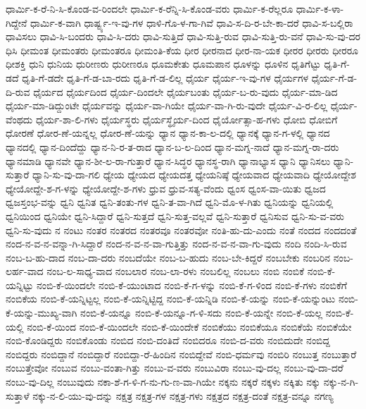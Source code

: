 {ಧಾರ್ಮಿ-ಕ-ರೆ-ನಿ-ಸಿ-ಕೊಂಡ-ವ-ರಿಂದಲೇ
ಧಾರ್ಮಿ-ಕ-ರೆನ್ನಿ-ಸಿ-ಕೊಂಡ-ವರು
ಧಾರ್ಮಿ-ಕ-ರೆಲ್ಲರೂ
ಧಾರ್ಮಿ-ಕ-ಳಾ-ಗಿದ್ದೇನೆ
ಧಾರ್ಮಿ-ಕ-ವಾಗಿ
ಧಾರ್ಷ್ಟ್ಯ-ಇ-ವು-ಗಳ
ಧಾಳಿ-ಗೊ-ಳ-ಗಾ-ಗಿವೆ
ಧಾವಿ-ಸ-ದಿ-ರ-ಬೇ-ಕಾ-ದರೆ
ಧಾವಿ-ಸ-ಬಲ್ಲಿರಾ
ಧಾವಿಸಲು
ಧಾವಿ-ಸಿ-ಬಂದರು
ಧಾವಿ-ಸಿ-ದರು
ಧಾವಿ-ಸುತ್ತಿದೆ
ಧಾವಿ-ಸುತ್ತಿ-ರುವ
ಧಾವಿ-ಸುತ್ತಿ-ರು-ವನೆ
ಧಾವಿ-ಸು-ವು-ದರ
ಧಿಸಿ
ಧೀಮಂತ
ಧೀಮಂತರು
ಧೀಮಂತರೂ
ಧೀಮಂತಿ-ಕೆಯ
ಧೀರ
ಧೀರನಾದ
ಧೀರ-ನಾ-ಯಕ
ಧೀರರ
ಧೀರರು
ಧೀರರೂ
ಧೀಶಕ್ತಿ
ಧುನಿ
ಧುನಿಯ
ಧುರೀಣರು
ಧುರೀಣರೂ
ಧೂಮಕೇತು
ಧೂಮಪಾನ
ಧೂಳನ್ನು
ಧೂಳಿನ
ಧೃತಿಗೆಟ್ಟು
ಧೃತಿ-ಗೆ-ಡದೆ
ಧೃತಿ-ಗೆ-ಡದೇ
ಧೃತಿ-ಗೆ-ಡ-ಬಾ-ರದು
ಧೃತಿ-ಗೆ-ಡ-ಲಿಲ್ಲ
ಧೈರ್ಯ
ಧೈರ್ಯ-ಇ-ವು-ಗಳ
ಧೈರ್ಯಗಳ
ಧೈರ್ಯ-ಗೆ-ಡ-ದಿ-ರುವ
ಧೈರ್ಯದ
ಧೈರ್ಯದಿಂದ
ಧೈರ್ಯ-ದಿಂದಲೇ
ಧೈರ್ಯಬಂತು
ಧೈರ್ಯ-ಬ-ರು-ವುದು
ಧೈರ್ಯ-ಮಾ-ಡಿದ
ಧೈರ್ಯ-ಮಾ-ಡಿದ್ದುಂಟೇ
ಧೈರ್ಯವನ್ನು
ಧೈರ್ಯ-ವಾ-ಗಿಯೇ
ಧೈರ್ಯ-ವಾ-ಗಿ-ರು-ವುದೇ
ಧೈರ್ಯ-ವಿ-ರ-ಲಿಲ್ಲ
ಧೈರ್ಯ-ವೆಂಥದು
ಧೈರ್ಯ-ಶಾ-ಲಿ-ಗಳು
ಧೈರ್ಯಸ್ಥರು
ಧೈರ್ಯಸ್ಥೈರ್ಯ-ದಿಂದ
ಧೈರ್ಯೋತ್ಸಾ-ಹ-ಗಳು
ಧೋಬಿ
ಧೋಬಿಗೆ
ಧೋರಣೆ
ಧೋರ-ಣೆ-ಯನ್ನಲ್ಲ
ಧೋರ-ಣೆ-ಯನ್ನು
ಧ್ಯಾನ
ಧ್ಯಾನ-ಕಾ-ಲ-ದಲ್ಲಿ
ಧ್ಯಾನಕ್ಕೆ
ಧ್ಯಾನ-ಗ-ಳಲ್ಲಿ
ಧ್ಯಾನದ
ಧ್ಯಾನದಲ್ಲಿ
ಧ್ಯಾನ-ದಿಂದೆದ್ದು
ಧ್ಯಾನ-ನಿ-ರ-ತ-ರಾದ
ಧ್ಯಾನ-ಬ-ಲ-ದಿಂದ
ಧ್ಯಾನ-ಮಗ್ನ-ನಾದೆ
ಧ್ಯಾನ-ಮಗ್ನ-ರಾ-ದರು
ಧ್ಯಾನಮಾಡಿ
ಧ್ಯಾನವೇ
ಧ್ಯಾನ-ಶೀ-ಲ-ರಾ-ಗುತ್ತಾರೆ
ಧ್ಯಾನ-ಸಿದ್ಧರ
ಧ್ಯಾನಸ್ಥ-ರಾಗಿ
ಧ್ಯಾನಾಭ್ಯಾಸ
ಧ್ಯಾನಿ
ಧ್ಯಾನಿಸಲು
ಧ್ಯಾನಿ-ಸುತ್ತಾರೆ
ಧ್ಯಾನಿ-ಸು-ವು-ದಾ-ಗಲಿ
ಧ್ಯೇಯ
ಧ್ಯೇಯದ
ಧ್ಯೇಯದತ್ತ
ಧ್ಯೇಯನಿಷ್ಠೆ
ಧ್ಯೇಯವಾದ
ಧ್ಯೇಯವಾದಿ
ಧ್ಯೇಯೋದ್ದೇಶ
ಧ್ಯೇಯೋದ್ದೇ-ಶ-ಗ-ಳನ್ನು
ಧ್ಯೇಯೋದ್ದೇ-ಶ-ಗಳು
ಧ್ರುವ
ಧ್ರುವ-ಸತ್ಯ-ವೆಂದು
ಧ್ವಂಸ
ಧ್ವಂಸ-ವಾ-ಯಿತು
ಧ್ವಜದ
ಧ್ವಜಸ್ತಂಭ-ವನ್ನು
ಧ್ವನಿ
ಧ್ವನಿತ
ಧ್ವನಿ-ತಂತು-ಗಳ
ಧ್ವನಿ-ತ-ವಾ-ಗಿದೆ
ಧ್ವನಿ-ಮೊ-ಳ-ಗಿತು
ಧ್ವನಿಯನ್ನು
ಧ್ವನಿಯಲ್ಲಿ
ಧ್ವನಿಯಿಂದ
ಧ್ವನಿಯೇ
ಧ್ವನಿ-ಸಿದ್ದಾರೆ
ಧ್ವನಿ-ಸುತ್ತದೆ
ಧ್ವನಿ-ಸುತ್ತ-ವಲ್ಲವೆ
ಧ್ವನಿ-ಸುತ್ತಾರೆ
ಧ್ವನಿಸುವ
ಧ್ವನಿ-ಸು-ವ-ವರು
ಧ್ವನಿ-ಸು-ವುದು
ನ
ನಂಟು
ನಂತರ
ನಂತರದ
ನಂತರವೂ
ನಂತರವೋ
ನಂತಿ-ಹು-ದು-ಎಂದು
ನಂತೆ
ನಂದದ
ನಂದದಂತೆ
ನಂದ-ನ-ವ-ನ-ವನ್ನಾ-ಗಿ-ಸಿದ್ದಾರೆ
ನಂದ-ನ-ವ-ನ-ವಾ-ಗುತ್ತಿತ್ತು
ನಂದ-ನ-ವ-ನ-ವಾ-ಗು-ವುದು
ನಂದಿ
ನಂದಿ-ಸಿ-ರುವ
ನಂಬ-ಬ-ಹು-ದಾದ
ನಂಬ-ದಾ-ದರು
ನಂಬದೆಯೇ
ನಂಬ-ಬ-ಹುದು
ನಂಬ-ಬೇ-ಕಿದ್ದರೆ
ನಂಬಬೇಕು
ನಂಬರಿನ
ನಂಬ-ಲರ್ಹ-ವಾದ
ನಂಬ-ಲ-ಸಾಧ್ಯ-ವಾದ
ನಂಬಲಾರ
ನಂಬ-ಲಾ-ರಳು
ನಂಬಲಿಲ್ಲ
ನಂಬಲು
ನಂಬಿ
ನಂಬಿಕೆ
ನಂಬಿ-ಕೆ-ಯನ್ನಿಟ್ಟು
ನಂಬಿ-ಕೆ-ಯಿಂದಲೇ
ನಂಬಿ-ಕೆ-ಯುಂಟಾದ
ನಂಬಿ-ಕೆ-ಗ-ಳನ್ನು
ನಂಬಿ-ಕೆ-ಗ-ಳಿಂದ
ನಂಬಿ-ಕೆ-ಗಳು
ನಂಬಿಕೆಗೆ
ನಂಬಿಕೆಯ
ನಂಬಿ-ಕೆ-ಯನ್ನಿಟ್ಟಲ್ಲ
ನಂಬಿ-ಕೆ-ಯನ್ನಿಟ್ಟಿದ್ದ
ನಂಬಿ-ಕೆ-ಯನ್ನಿಡಿ
ನಂಬಿ-ಕೆ-ಯನ್ನು
ನಂಬಿ-ಕೆ-ಯನ್ನುಂಟು
ನಂಬಿ-ಕೆ-ಯನ್ನು-ಮುಖ್ಯ-ವಾಗಿ
ನಂಬಿ-ಕೆ-ಯನ್ನೂ
ನಂಬಿ-ಕೆ-ಯನ್ನೂ-ಗ-ಳಿ-ಸದು
ನಂಬಿ-ಕೆ-ಯನ್ನೇ
ನಂಬಿ-ಕೆ-ಯಲ್ಲ
ನಂಬಿ-ಕೆ-ಯಲ್ಲಿ
ನಂಬಿ-ಕೆ-ಯಿಂದ
ನಂಬಿ-ಕೆ-ಯಿಂದಲೇ
ನಂಬಿ-ಕೆ-ಯಿಂದೇಕೆ
ನಂಬಿಕೆಯು
ನಂಬಿಕೆಯೂ
ನಂಬಿಕೆಯೆ
ನಂಬಿಕೆಯೇ
ನಂಬಿ-ಕೊಂಡಿದ್ದರು
ನಂಬಿಕೊಂಡು
ನಂಬಿದ
ನಂಬಿ-ದಂತಿದೆ
ನಂಬಿದರೂ
ನಂಬಿ-ದ-ವರು
ನಂಬಿದುದೇ
ನಂಬಿದ್ದ
ನಂಬಿದ್ದರು
ನಂಬಿದ್ದಾನೆ
ನಂಬಿದ್ದಾರೆ
ನಂಬಿದ್ದಾ-ರೆ-ಹಿಂದಿನ
ನಂಬಿದ್ದೇವೆ
ನಂಬಿ-ಧರ್ಮವು
ನಂಬಿರಿ
ನಂಬುತ್ತ
ನಂಬುತ್ತಾರೆ
ನಂಬುತ್ತೇವೋ
ನಂಬುವ
ನಂಬು-ವಂತಾ-ಗಿತ್ತು
ನಂಬು-ವ-ವರು
ನಂಬುವಿರಾ
ನಂಬು-ವು-ದಲ್ಲ
ನಂಬು-ವು-ದಾ-ದರೆ
ನಂಬು-ವು-ದಿಲ್ಲ
ನಂಬುವುದು
ನಕಾ-ಶೆ-ಗ-ಳಿ-ಗ-ನು-ಗು-ಣ-ವಾ-ಗಿಯೇ
ನಕ್ಕನು
ನಕ್ಕರೆ
ನಕ್ಕಳು
ನಕ್ಕಿತು
ನಕ್ಕು
ನಕ್ಕು-ನ-ಗಿ-ಸುತ್ತಾಳೆ
ನಕ್ಕು-ನ-ಲಿ-ಯು-ವು-ದನ್ನು
ನಕ್ಷತ್ರ
ನಕ್ಷತ್ರ-ಗಳ
ನಕ್ಷತ್ರ-ಗಳು
ನಕ್ಷತ್ರದ
ನಕ್ಷತ್ರ-ದಂತೆ
ನಕ್ಷತ್ರ-ವನ್ನೂ
ನಗಣ್ಯ
}
